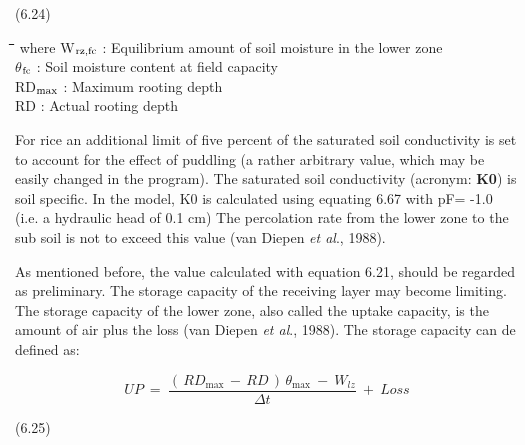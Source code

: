 \documentclass[11pt]{article}
\begin{document}
 \bigskip
\strut\hfill (6.24)
\nwln
\begin{tabbing}
\hspace{1.27cm}\=\hspace{1.27cm}\=\hspace{1.27cm}\=\hspace{1.27cm}\=%
\hspace{1.27cm}\=\hspace{1.27cm}\=\hspace{1.27cm}\=\hspace{1.27cm}\=%
\hspace{1.27cm}\=\hspace{1.27cm}\=\kill
where\> W$_{{\rm rz,fc}}$\> : Equilibrium amount of soil moisture in the lower zone\> \> \> \> \> \> \> \> [cm]\\
\>$\theta$$_{{\rm fc}}$\> : Soil moisture content at field capacity\> \> \> \> \> \> \> \> [cm$^{{\rm 3}}$ cm$^{{\rm -3}}$]\\
\>RD$_{{\rm max}}$\> : Maximum rooting depth\> \> \> \> \> \> \> \> [cm]\\
\>RD\> : Actual rooting depth\> \> \> \> \> \> \> \> [cm]
\end{tabbing}
 For rice an addi\-tional limit of five percent of the saturated soil conductivity is set to
account for the effect of puddling (a rather arbitrary value, which may be easily changed
in the program). The saturated soil conductivity (acronym: {\bf K0}) is soil specific. In the
model, K0 is calculated using equating 6.67 with pF= -1.0 (i.e. a hydraulic head of 0.1
cm) The percolation rate from the lower zone to the sub soil is not to exceed this value
(van Diepen {\it et al\/}., 1988). 

\bigskip
\bigskip
As mentioned before, the value calculated with equation 6.21, should be regarded as
preliminary. The storage capacity of the receiving layer may become limiting. The
storage capacity of the lower zone, also called the uptake capacity, is the amount of air
plus the loss (van Diepen {\it et al\/}., 1988). The storage capacity can de defined as:

\begin{displaymath}
UP  ~=~{\frac{(\, RD _{\max } \, -\, RD\, )\, \theta  _{\max } ~-~ W _{lz} }{\Delta t}} ~+~ Loss
\end{displaymath}

 \bigskip
\strut\hfill (6.25)
\end{document}
